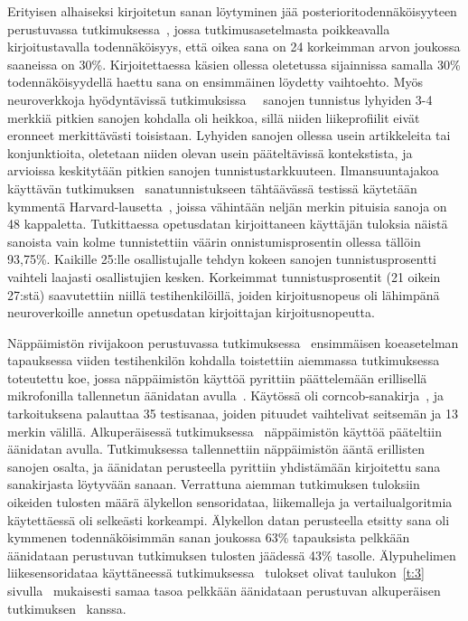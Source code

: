 \documentclass[finnish]{tktltiki2}
\theoremstyle{definition}
\theoremstyle{remark}
\begin{document}
\pagebreak
Erityisen alhaiseksi kirjoitetun sanan löytyminen jää posterioritodennäköisyyteen perustuvassa tutkimuksessa~\cite{mole}, jossa tutkimusasetelmasta poikkeavalla kirjoitustavalla todennäköisyys, että oikea sana on 24 korkeimman arvon joukossa saaneissa on 30\%. Kirjoitettaessa käsien ollessa oletetussa sijainnissa samalla 30\% todennäköisyydellä haettu sana on ensimmäinen löydetty vaihtoehto. Myös neuroverkkoja hyödyntävissä tutkimuksissa~\cite{maiti}~\cite{liu} sanojen tunnistus lyhyiden 3-4 merkkiä pitkien sanojen kohdalla oli heikkoa, sillä niiden liikeprofiilit eivät eronneet merkittävästi toisistaan. Lyhyiden sanojen ollessa usein artikkeleita tai konjunktioita, oletetaan niiden olevan usein pääteltävissä kontekstista, ja arvioissa keskitytään pitkien sanojen tunnistustarkkuuteen. Ilmansuuntajakoa käyttävän tutkimuksen~\cite{maiti} sanatunnistukseen tähtäävässä testissä käytetään kymmentä Harvard-lausetta~\cite{har}, joissa vähintään neljän merkin pituisia sanoja on 48 kappaletta. Tutkittaessa opetusdatan kirjoittaneen käyttäjän tuloksia näistä sanoista vain kolme tunnistettiin väärin onnistumisprosentin ollessa tällöin 93,75\%. Kaikille 25:lle osallistujalle tehdyn kokeen sanojen tunnistusprosentti vaihteli laajasti osallistujien kesken. Korkeimmat tunnistusprosentit (21 oikein 27:stä) saavutettiin niillä testihenkilöillä, joiden kirjoitusnopeus oli lähimpänä neuroverkoille annetun opetusdatan kirjoittajan kirjoitusnopeutta. 

Näppäimistön rivijakoon perustuvassa tutkimuksessa~\cite{liu} ensimmäisen koeasetelman tapauksessa viiden testihenkilön kohdalla toistettiin aiemmassa tutkimuksessa toteutettu koe, jossa näppäimistön käyttöä pyrittiin päättelemään erillisellä mikrofonilla tallennetun äänidatan avulla~\cite{berger}. Käytössä oli corncob-sanakirja~\cite{corn}, ja tarkoituksena palauttaa 35 testisanaa, joiden pituudet vaihtelivat seitsemän ja 13 merkin välillä.
Alkuperäisessä tutkimuksessa~\cite{berger} näppäimistön käyttöä pääteltiin äänidatan avulla. Tutkimuksessa tallennettiin näppäimistön ääntä erillisten sanojen osalta, ja äänidatan perusteella pyrittiin yhdistämään kirjoitettu sana sanakirjasta löytyvään sanaan. Verrattuna aiemman tutkimuksen tuloksiin oikeiden tulosten määrä älykellon sensoridataa, liikemalleja ja vertailualgoritmia käytettäessä oli selkeästi korkeampi. Älykellon datan perusteella etsitty sana oli kymmenen todennäköisimmän sanan joukossa 63\% tapauksista pelkkään äänidataan perustuvan tutkimuksen tulosten jäädessä 43\% tasolle. Älypuhelimen liikesensoridataa käyttäneessä tutkimuksessa~\cite{mar} tulokset olivat taulukon~\ref{t:3} sivulla~\pageref{t:3} mukaisesti samaa tasoa pelkkään äänidataan perustuvan alkuperäisen tutkimuksen~\cite{berger} kanssa.
\end{document}

